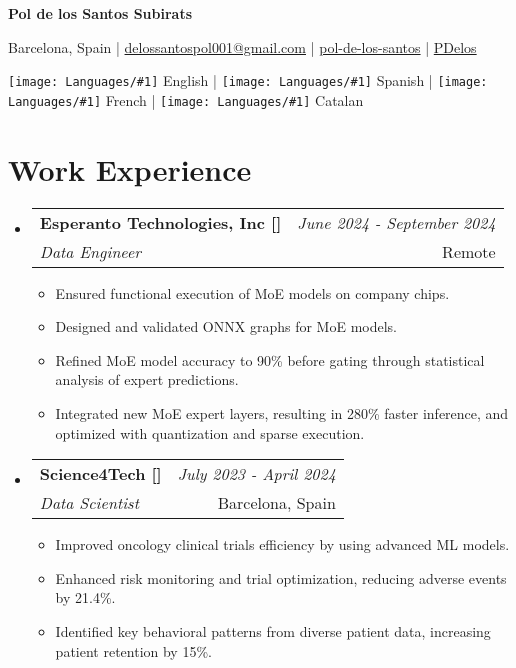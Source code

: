 \documentclass[a4paper,10pt]{article}
\makeatletter
\newcommand{\resumeSubheading}[4]{
\item
    \begin{tabular*}{0.98\textwidth}[t]{l@{\extracolsep{\fill}}r}
        \textbf{#1} & \textit{\footnotesize{#4}} \\
        \textit{#3} &  \footnotesize{#2}\\
    \end{tabular*}
    \vspace{-2.4mm}
}
\newcommand{\resumeSubHeadingListStart}{\begin{itemize}[leftmargin=*,labelsep=1mm]}
\newcommand{\resumeItemListStart}{\begin{itemize}[leftmargin=*,labelsep=1mm,itemsep=0.1mm]}
\newcommand{\resumeSubHeadingListEnd}{\end{itemize}\vspace{2mm}}
\newcommand{\resumeItemListEnd}{\end{itemize}\vspace{-2mm}}
\newcommand{\socialicon}[1]{\raisebox{-0.05em}{\resizebox{!}{1em}{#1}}}
\newcommand{\headerfontiii}{\fontfamily{ppl}\selectfont}
\newcommand{\langflag}[1]{\texttt{[image: Languages/\#1]}}
\makeatother
\begin{document}
\headerfontiii

\begin{center}
    {\Huge\textbf{Pol de los Santos Subirats}}
\end{center}

\vspace{-4mm}

\begin{center}
    \small{
    Barcelona, Spain |
    \href{mailto:delossantospol001@gmail.com}{delossantospol001@gmail.com} | 
    \socialicon{\faLinkedin} \href{https://www.linkedin.com/in/pol-de-los-santos-subirats/}{pol-de-los-santos} | 
    \socialicon{\faGithub} \href{https://github.com/PDelos}{PDelos} 
    }
\end{center}
\vspace{-5mm}
\begin{center}
\small{
    \langflag{England.png} English |
    \langflag{Spain.png} Spanish |
    \langflag{France.png} French |
    \langflag{Catalan.png} Catalan 
}
\end{center}
\vspace{-9mm}


\section{\textbf{Work Experience}}
\resumeSubHeadingListStart
\resumeSubheading
    {Esperanto Technologies, Inc [\href{https://www.esperanto.ai/}{\faIcon{globe}}]}{Remote}
    {Data Engineer}{June 2024 - September 2024}
    \resumeItemListStart
    \item Ensured functional execution of MoE models on company chips.
    \item Designed and validated ONNX graphs for MoE models.
    \item Refined MoE model accuracy to 90\% before gating through statistical analysis of expert predictions.
    \item Integrated new MoE expert layers, resulting in 280\% faster inference, and optimized with quantization and sparse execution.
    \resumeItemListEnd
\resumeSubheading
    {Science4Tech [\href{https://s4t.health/}{\faIcon{globe}}]}{Barcelona, Spain}
    {Data Scientist}{July 2023 - April 2024}
    \resumeItemListStart
    \item Improved oncology clinical trials efficiency by using advanced ML models.
    \item Enhanced risk monitoring and trial optimization, reducing adverse events by 21.4\%.
    \item Identified key behavioral patterns from diverse patient data, increasing patient retention by 15\%.
    \resumeItemListEnd 
\resumeSubHeadingListEnd
\vspace{-5mm}
\end{document}
